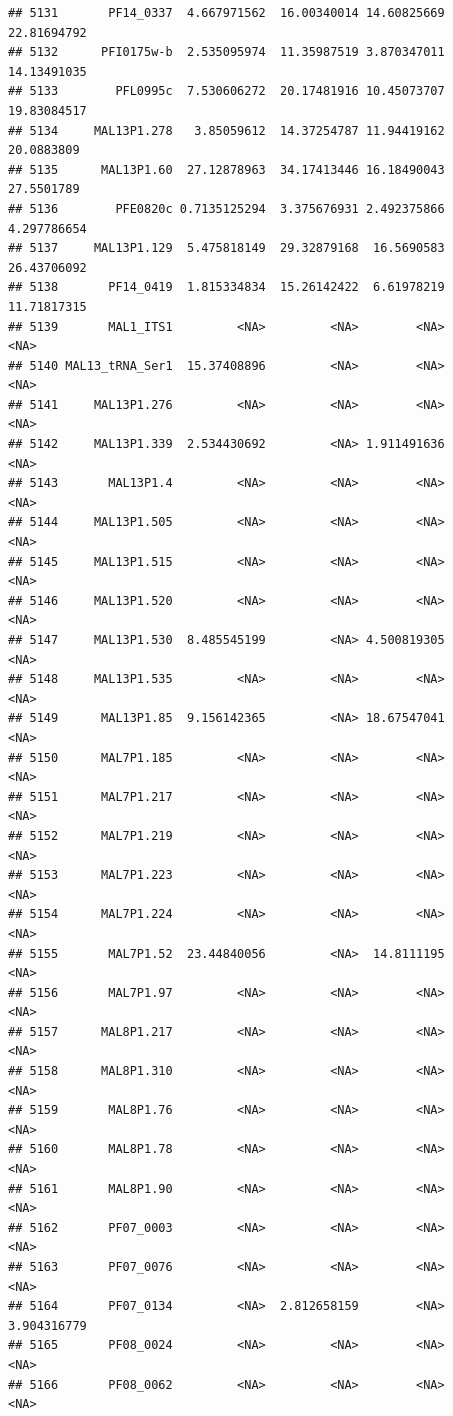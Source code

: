 \documentclass[12pt, a4paper]{article}\usepackage[]{graphicx}\usepackage[]{color}
\makeatletter
\newenvironment{kframe}{%
 \def\at@end@of@kframe{}%
 \ifinner\ifhmode%
  \def\at@end@of@kframe{\end{minipage}}%
  \begin{minipage}{\columnwidth}%
 \fi\fi%
 \def\FrameCommand##1{\hskip\@totalleftmargin \hskip-\fboxsep
 \colorbox{shadecolor}{##1}\hskip-\fboxsep
     \hskip-\linewidth \hskip-\@totalleftmargin \hskip\columnwidth}%
 \MakeFramed {\advance\hsize-\width
   \@totalleftmargin\z@ \linewidth\hsize
   \@setminipage}}%
 {\par\unskip\endMakeFramed%
 \at@end@of@kframe}
\newenvironment{knitrout}{}{} %
\makeatother
\begin{document}
\begin{knitrout}
\begin{kframe}
\begin{verbatim}
## 5131       PF14_0337  4.667971562  16.00340014 14.60825669 22.81694792
## 5132      PFI0175w-b  2.535095974  11.35987519 3.870347011 14.13491035
## 5133        PFL0995c  7.530606272  20.17481916 10.45073707 19.83084517
## 5134     MAL13P1.278   3.85059612  14.37254787 11.94419162  20.0883809
## 5135      MAL13P1.60  27.12878963  34.17413446 16.18490043  27.5501789
## 5136        PFE0820c 0.7135125294  3.375676931 2.492375866 4.297786654
## 5137     MAL13P1.129  5.475818149  29.32879168  16.5690583 26.43706092
## 5138       PF14_0419  1.815334834  15.26142422  6.61978219 11.71817315
## 5139       MAL1_ITS1         <NA>         <NA>        <NA>        <NA>
## 5140 MAL13_tRNA_Ser1  15.37408896         <NA>        <NA>        <NA>
## 5141     MAL13P1.276         <NA>         <NA>        <NA>        <NA>
## 5142     MAL13P1.339  2.534430692         <NA> 1.911491636        <NA>
## 5143       MAL13P1.4         <NA>         <NA>        <NA>        <NA>
## 5144     MAL13P1.505         <NA>         <NA>        <NA>        <NA>
## 5145     MAL13P1.515         <NA>         <NA>        <NA>        <NA>
## 5146     MAL13P1.520         <NA>         <NA>        <NA>        <NA>
## 5147     MAL13P1.530  8.485545199         <NA> 4.500819305        <NA>
## 5148     MAL13P1.535         <NA>         <NA>        <NA>        <NA>
## 5149      MAL13P1.85  9.156142365         <NA> 18.67547041        <NA>
## 5150      MAL7P1.185         <NA>         <NA>        <NA>        <NA>
## 5151      MAL7P1.217         <NA>         <NA>        <NA>        <NA>
## 5152      MAL7P1.219         <NA>         <NA>        <NA>        <NA>
## 5153      MAL7P1.223         <NA>         <NA>        <NA>        <NA>
## 5154      MAL7P1.224         <NA>         <NA>        <NA>        <NA>
## 5155       MAL7P1.52  23.44840056         <NA>  14.8111195        <NA>
## 5156       MAL7P1.97         <NA>         <NA>        <NA>        <NA>
## 5157      MAL8P1.217         <NA>         <NA>        <NA>        <NA>
## 5158      MAL8P1.310         <NA>         <NA>        <NA>        <NA>
## 5159       MAL8P1.76         <NA>         <NA>        <NA>        <NA>
## 5160       MAL8P1.78         <NA>         <NA>        <NA>        <NA>
## 5161       MAL8P1.90         <NA>         <NA>        <NA>        <NA>
## 5162       PF07_0003         <NA>         <NA>        <NA>        <NA>
## 5163       PF07_0076         <NA>         <NA>        <NA>        <NA>
## 5164       PF07_0134         <NA>  2.812658159        <NA> 3.904316779
## 5165       PF08_0024         <NA>         <NA>        <NA>        <NA>
## 5166       PF08_0062         <NA>         <NA>        <NA>        <NA>

\end{verbatim}
\end{kframe}
\end{knitrout}
\end{document}
